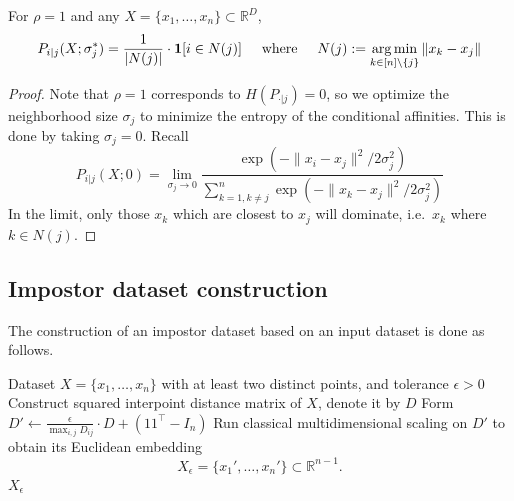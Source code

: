 \begin{lemma}\label{lem:rho_equal_one}  For \(\rho=1\) and any \(X = \{x_1,\dots, x_n\}\subset \mathbb{R}^D\),
\[P_{i|j}(X; \sigma^*_j) = \frac{1}{|N(j)|}\cdot \textbf{1}[i \in N(j)] \hspace{0.5cm}\text{where} \hspace{0.5cm} N(j) := \operatorname*{arg\,min}_{k\in [n]\setminus\{j\}} \|x_k - x_j\|\]
\end{lemma}
\begin{proof}
    Note that \(\rho = 1\) corresponds to \(H(P_{\cdot|j}) = 0\), so we optimize the neighborhood size \(\sigma_j\) to minimize the entropy of the conditional affinities. This is done by taking \(\sigma_j = 0\). Recall
\[P_{i|j}(X; 0) = \lim_{\sigma_j \to 0} \frac{\exp(-\|x_i-x_j\|^2/2\sigma_j^2)}{\sum_{k=1, k\neq j}^n \exp(-\|x_k - x_j\|^2/2\sigma_j^2)} \]
    In the limit, only those \(x_k\) which are closest to \(x_j\) will dominate, i.e.\ \(x_k\) where \(k\in N(j)\). 
\end{proof}




















\subsection{Impostor dataset construction}
\label{app:impostor_construction}

The construction of an impostor dataset based on an input dataset is done as follows.

\begin{algorithm}[H]
\caption{Impostor Dataset Creation}
\label{alg:impostor}
\begin{algorithmic}[1]
\Require Dataset $X = \{x_1, \ldots, x_n\}$ with at least two distinct points, and tolerance $\epsilon > 0$
\State Construct squared interpoint distance matrix of $X$, denote it by $D$
\State Form $D' \gets \frac{\epsilon}{\max_{i,j} D_{ij}} \cdot D + (11^\top - I_n)$
\State Run classical multidimensional scaling on $D'$ to obtain its Euclidean embedding $$X_\epsilon = \{x_1', \ldots, x_n'\} \subset \mathbb{R}^{n-1}.$$
\State \Return $X_\epsilon$
\end{algorithmic}
\end{algorithm}


